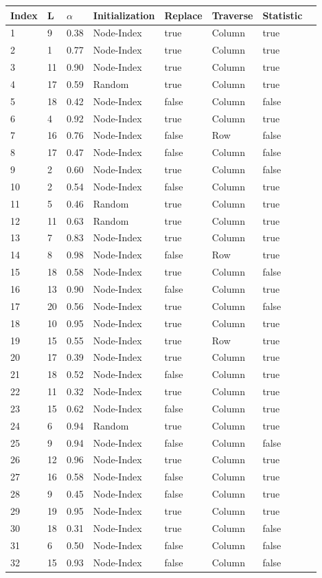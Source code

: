 \documentclass[12pt,a4paper,twoside]{scrartcl}
\numberwithin{equation}{section}
\begin{document}
\begin{center}
\label{table:parameter combinations}
  \begin{tabular}{| l | l l l l l l |p{2cm}|}
   \hline
Index&L& $\alpha$ &Initialization&Replace&Traverse& Statistic\\ \hline
1&9 &0.38 &Node-Index&true&Column&true\\
2&1 &0.77&Node-Index&true&Column&true\\
3&11 &0.90&Node-Index&true&Column&true \\
4&17 &0.59&Random&true&Column&true \\
5&18 &0.42&Node-Index&false&Column&false\\\hline
6&4 &0.92&Node-Index&true&Column&true \\
7&16 &0.76&Node-Index&false&Row&false\\
8&17 &0.47&Node-Index&false&Column&false\\
9&2 &0.60&Node-Index&true&Column&false\\
10&2 &0.54&Node-Index&false&Column&true\\\hline
11&5 &0.46&Random&true&Column&true\\
12&11 &0.63&Random&true &Column&true\\
13&7 &0.83&Node-Index&true&Column&true\\
14&8 &0.98&Node-Index&false &Row&true\\
15&18 &0.58&Node-Index&true&Column&false \\\hline
16&13 &0.90&Node-Index&false&Column&true \\
17&20 &0.56&Node-Index&true &Column&false\\
18&10&0.95&Node-Index&true &Column&true\\
19&15 &0.55&Node-Index&true&Row&true\\
20&17 &0.39&Node-Index&true&Column&true \\\hline
21&18 &0.52&Node-Index&false&Column&true\\
22&11 &0.32&Node-Index&true&Column&true \\
23&15 &0.62&Node-Index&false&Column&true \\
24&6 &0.94&Random&true&Column&true\\
25&9 &0.94&Node-Index&false&Column &false\\\hline
26&12 &0.96&Node-Index&true&Column&true\\
27&16 &0.58&Node-Index&false&Column&true\\
28&9 &0.45&Node-Index&false&Column&true\\
29&19 &0.95&Node-Index&true&Column&true \\
30&18 &0.31&Node-Index&true&Column &false\\\hline
31&6 &0.50&Node-Index&false&Column&false\\
32&15 &0.93&Node-Index&false&Column &false\\\hline


    \end{tabular}
\end{center}
\end{document}
